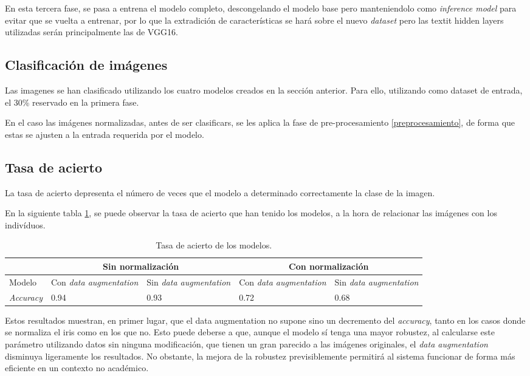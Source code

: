 En esta tercera fase, se pasa a entrena el modelo completo, descongelando el modelo base pero manteniendolo como \textit{inference model} para evitar que se vuelta a entrenar,  por lo que la extradición de características se hará sobre el nuevo \textit{dataset} pero las textit {hidden layers} utilizadas serán principalmente las de VGG16.

\subsection{Clasificación de imágenes}

Las imagenes se han clasificado utilizando los cuatro modelos creados en la sección anterior. Para ello, utilizando como dataset de entrada, el 30\% reservado en la primera fase.

En el caso las imágenes normalizadas, antes de ser clasificars, se les aplica la fase de pre-procesamiento \ref{preprocesamiento}, de forma que estas se ajusten a la entrada requerida por el modelo.

\subsection{Tasa de acierto} 

La tasa de acierto depresenta el número de veces que el modelo a determinado correctamente la clase de la imagen. 

En la siguiente tabla \ref{tabla:tasa-acierto-modelos}, se puede observar la tasa de acierto que han tenido los modelos, a la hora de relacionar las imágenes
 con los indivíduos.

\begin{table}[h!]
\begin{tabular}{ |p{2cm}||p{2cm}|p{2cm}|p{2cm}|p{2cm}|  }
    \hline
     & \multicolumn{2}{|c|}{Sin normalización} & \multicolumn{2}{|c|}{Con normalización} \\
    \hline
    Modelo& Con \textit{data augmentation} & Sin \textit{data augmentation} &Con \textit{data augmentation}&Sin \textit{data augmentation}\\
    \hline
    \textit{Accuracy} & 0.94   & 0.93    & 0.72 &   0.68\\
    \hline
   \end{tabular}
   \caption{\label{tabla:tasa-acierto-modelos}Tasa de acierto de los modelos.}
\end{table}


Estos resultados muestran, en primer lugar, que el data augmentation no supone sino un decremento del \textit{accuracy}, tanto en los casos donde se normaliza el iris
como en los que no. Esto puede deberse a que, aunque el modelo sí tenga una mayor robustez, al calcularse este parámetro utilizando datos sin ninguna modificación, que 
tienen un gran parecido a las imágenes originales, el \textit{data augmentation} disminuya ligeramente los resultados. No obstante, la mejora de la robustez previsiblemente
permitirá al sistema funcionar de forma más eficiente en un contexto no académico.

